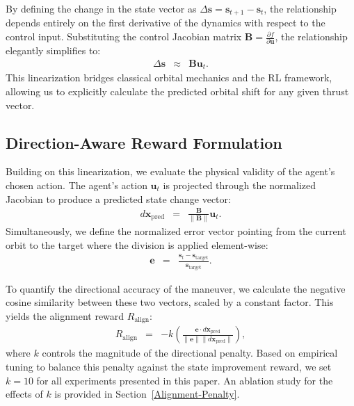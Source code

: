 \documentclass[paper]{ieice}
\begin{document}
By defining the change in the state vector as \mbox{$\Delta \mathbf{s} = \mathbf{s}_{t+1} \!-\! \mathbf{s}_t$}, the relationship depends entirely on the first derivative of the dynamics with respect to the control input. Substituting the control Jacobian matrix \mbox{$\mathbf{B} = \frac{\partial f}{\partial \mathbf{u}}$}, the relationship elegantly simplifies to:
\begin{eqnarray}
    \Delta \mathbf{s}
    & \approx &
    \mathbf{B} \mathbf{u}_t.
\end{eqnarray}
This linearization bridges classical orbital mechanics and the RL framework, allowing us to explicitly calculate the predicted orbital shift for any given thrust vector.

\subsection{Direction-Aware Reward Formulation}
Building on this linearization, we evaluate the physical validity of the agent's chosen action. The agent's action $\mathbf{u}_t$ is projected through the normalized Jacobian to produce a predicted state change vector:
\begin{eqnarray}
    d\mathbf{x}_{\mathrm{pred}}
    & = &
    \frac{\mathbf{B}}{\|\mathbf{B}\|} \mathbf{u}_t.
\end{eqnarray}
Simultaneously, we define the normalized error vector pointing from the current orbit to the target where the division is applied element-wise:
\begin{eqnarray}
    \mathbf{e}
    & = &
    \frac{\mathbf{s}_t - \mathbf{s}_{\mathrm{target}}}{\mathbf{s}_{\mathrm{target}}}.
\end{eqnarray}

To quantify the directional accuracy of the maneuver, we calculate the negative cosine similarity between these two vectors, scaled by a constant factor. This yields the alignment reward $R_{\mathrm{align}}$:
\begin{eqnarray}
    R_{\mathrm{align}}
    & = &
    -k \left( \frac{\mathbf{e} \cdot d\mathbf{x}_{\mathrm{pred}}}{\|\mathbf{e}\| \|d\mathbf{x}_{\mathrm{pred}}\|} \right),
\end{eqnarray}
where $k$ controls the magnitude of the directional penalty. Based on empirical tuning to balance this penalty against the state improvement reward, we set $k = 10$ for all experiments presented in this paper. An ablation study for the effects of $k$ is provided in Section~\ref{Alignment-Penalty}.
\end{document}
